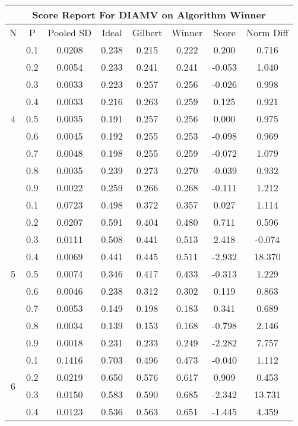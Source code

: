 \documentclass[11pt,a4paper]{report}
\begin{document}
\begin{longtable}{ | c | c || c | c | c | c | c | c | }
\hline
\multicolumn{8}{|c|}{ Score Report For DIAMV on Algorithm Winner} \\
\hline
N & P & Pooled SD &  Ideal &  Gilbert & Winner  & Score & Norm Diff \\
 \hline
 \hline
 \endhead
\multirow{9}{*}{4} & 0.1 & 0.0208 & 0.238 & 0.215 & 0.222 & 0.200 & 0.716 \\
 & 0.2 & 0.0054 & 0.233 & 0.241 & 0.241 & -0.053 & 1.040 \\
 & 0.3 & 0.0033 & 0.223 & 0.257 & 0.256 & -0.026 & 0.998 \\
 & 0.4 & 0.0033 & 0.216 & 0.263 & 0.259 & 0.125 & 0.921 \\
 & 0.5 & 0.0035 & 0.191 & 0.257 & 0.256 & 0.000 & 0.975 \\
 & 0.6 & 0.0045 & 0.192 & 0.255 & 0.253 & -0.098 & 0.969 \\
 & 0.7 & 0.0048 & 0.198 & 0.255 & 0.259 & -0.072 & 1.079 \\
 & 0.8 & 0.0035 & 0.239 & 0.273 & 0.270 & -0.039 & 0.932 \\
 & 0.9 & 0.0022 & 0.259 & 0.266 & 0.268 & -0.111 & 1.212 \\
 \hline
\multirow{9}{*}{5} & 0.1 & 0.0723 & 0.498 & 0.372 & 0.357 & 0.027 & 1.114 \\
 & 0.2 & 0.0207 & 0.591 & 0.404 & 0.480 & 0.711 & 0.596 \\
 & 0.3 & 0.0111 & 0.508 & 0.441 & 0.513 & 2.418 & -0.074 \\
 & 0.4 & 0.0069 & 0.441 & 0.445 & 0.511 & -2.932 & 18.370 \\
 & 0.5 & 0.0074 & 0.346 & 0.417 & 0.433 & -0.313 & 1.229 \\
 & 0.6 & 0.0046 & 0.238 & 0.312 & 0.302 & 0.119 & 0.863 \\
 & 0.7 & 0.0053 & 0.149 & 0.198 & 0.183 & 0.341 & 0.689 \\
 & 0.8 & 0.0034 & 0.139 & 0.153 & 0.168 & -0.798 & 2.146 \\
 & 0.9 & 0.0018 & 0.231 & 0.233 & 0.249 & -2.282 & 7.757 \\
 \hline
\multirow{9}{*}{6} & 0.1 & 0.1416 & 0.703 & 0.496 & 0.473 & -0.040 & 1.112 \\
 & 0.2 & 0.0219 & 0.650 & 0.576 & 0.617 & 0.909 & 0.453 \\
 & 0.3 & 0.0150 & 0.583 & 0.590 & 0.685 & -2.342 & 13.731 \\
 & 0.4 & 0.0123 & 0.536 & 0.563 & 0.651 & -1.445 & 4.359 \\

\end{longtable}
\end{document}
